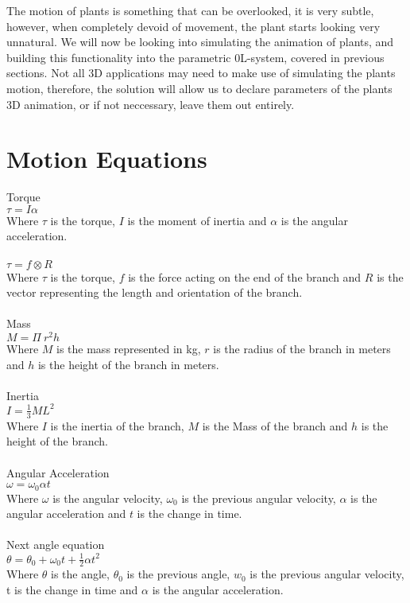 
\begin{flushleft}

The motion of plants is something that can be overlooked, it is very subtle, however, when completely devoid of movement, the plant starts looking very unnatural. We will now be looking into simulating the animation of plants, and building this functionality into the parametric 0L-system, covered in previous sections. Not all 3D applications may need to make use of simulating the plants motion, therefore, the solution will allow us to declare parameters of the plants 3D animation, or if not neccessary, leave them out entirely. \\

\vspace{5mm}

\cite{barron2001real}

\end{flushleft}

\section{Motion Equations}

Torque\\
$ \tau = I\alpha $ \\
Where $\tau$ is the torque, $I$ is the moment of inertia and $\alpha$ is the angular acceleration.\\
\\
$ \tau = f \otimes R $ \\
Where $\tau$ is the torque, $f$ is the force acting on the end of the branch and $R$ is the vector representing the length and orientation of the branch. \\
\\
Mass \\
$ M = \Pi~ r ^ 2 h $  \\
Where $M$ is the mass represented in kg, $r$ is the radius of the branch in meters and $h$ is the height of the branch in meters. \\
\\
Inertia\\
$ I = \frac{1}{3} M L ^ 2 $ \\ 
Where $I$ is the inertia of the branch, $M$ is the Mass of the branch and $h$ is the height of the branch. \\
\\
Angular Acceleration\\
$ \omega = \omega _0 \alpha t $ \\
Where $\omega$ is the angular velocity, $\omega _0 $ is the previous angular velocity, $\alpha$ is the angular acceleration and $t$ is the change in time. \\
\\
Next angle equation\\
$ \theta = \theta _0 + \omega _0 t + \frac{1}{2} \alpha t ^2 $ \\
Where $\theta$ is the angle, $\theta _0$ is the previous angle, $w _0$ is the previous angular velocity, t is the change in time and $\alpha$ is the angular acceleration. \\
\\

